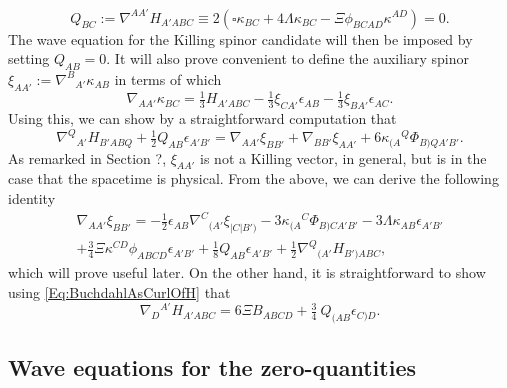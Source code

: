 \documentclass[10pt,a4paper]{article}
\theoremstyle{plain}
\begin{document}
\begin{equation}
 Q_{BC} := \nabla^{AA'}H_{A'ABC} \equiv  2(\square \kappa_{BC} + 4 \Lambda\kappa_{BC}  - \Xi  \phi_{BCAD}\kappa^{AD})=0. \label{Eq:WaveForKS}
\end{equation}
The wave equation for the Killing spinor candidate will then be imposed by setting $Q_{AB}=0$. It will also prove convenient to define the auxiliary spinor $\xi_{AA'} := \nabla^{B}{}_{A'}\kappa_{AB}$  
in terms of which
\begin{equation}
\nabla_{AA'}\kappa_{BC} = \tfrac{1}{3} H_{A'ABC} -  \tfrac{1}{3} \xi_{CA'} \epsilon_{AB} -  \tfrac{1}{3} \xi_{BA'} \epsilon_{AC}.\label{Eq:DecompGradKS}
\end{equation}
Using this, we can show by a straightforward computation that
\[  \nabla^Q{}_{A'}H_{B'ABQ} + \tfrac{1}{2} Q_{AB} \epsilon_{A'B'} = \nabla_{AA'}\xi_{BB'} + \nabla_{BB'}\xi_{AA'} + 6 \kappa_{(A}{}^{Q} \Phi_{B)QA'B'}  . \]
 As remarked in Section ?, $\xi_{AA'}$ is not a Killing vector, in general, but is in the case that the spacetime is physical. 
From the above, we can derive the following identity
\begin{multline}
\nabla_{AA'}\xi_{BB'} = -  \tfrac{1}{2} \epsilon_{AB} \nabla^{C}{}_{(A'}\xi_{|C|B')}- 3 \kappa_{(A}{}^{C} \Phi_{B)CA'B'}  - 3 \Lambda \kappa_{AB}  \epsilon_{A'B'} \\+ \tfrac{3}{4} \Xi \kappa^{CD} \phi_{ABCD} \epsilon_{A'B'} + \tfrac{1}{8} Q_{AB} \epsilon_{A'B'} + \tfrac{1}{2} \nabla^Q{}_{(A'}H_{B')ABC},\label{Eq:DecompGradXi}
\end{multline}
which will prove useful later. On the other hand, it is straightforward to show using \eqref{Eq:BuchdahlAsCurlOfH} that
\begin{equation}
     \nabla_{D}{}^{A'}H_{A'ABC} = 6 \Xi B_{ABCD} + \tfrac{3}{4} \
Q_{(AB}\epsilon_{C)D}.\label{IrrDecompCurlOfH}
\end{equation}


\subsection{Wave equations for the zero-quantities}
\end{document}
